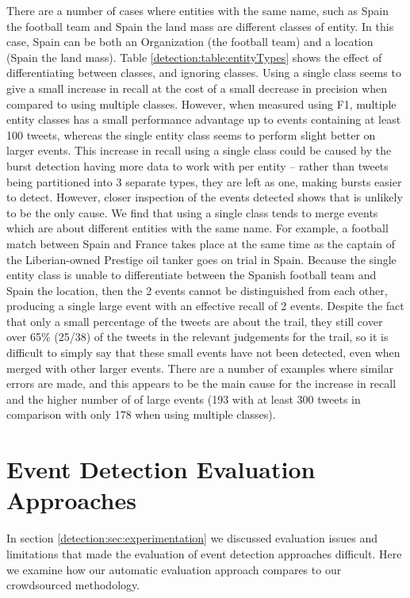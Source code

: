 There are a number of cases where entities with the same name, such as Spain the football team and Spain the land mass are different classes of entity. In this case, Spain can be both an Organization (the football team) and a location (Spain the land mass).
Table \ref{detection:table:entityTypes} shows the effect of differentiating between classes, and ignoring classes. Using a single class seems to give a small increase in recall at the cost of a small decrease in precision when compared to using multiple classes. However, when measured using F1, multiple entity classes has a small performance advantage up to events containing at least 100 tweets, whereas the single entity class seems to perform slight better on larger events. This increase in recall using a single class could be caused by the burst detection having more data to work with per entity -- rather than tweets being partitioned into 3 separate types, they are left as one, making bursts easier to detect. However, closer inspection of the events detected shows that is unlikely to be the only cause. We find that using a single class tends to merge events which are about different entities with the same name. For example, a football match between Spain and France takes place at the same time as the captain of the Liberian-owned Prestige oil tanker goes on trial in Spain. Because the single entity class is unable to differentiate between the Spanish football team and Spain the location, then the 2 events cannot be distinguished from each other, producing a single large event with an effective recall of 2 events. Despite the fact that only a small percentage of the tweets are about the trail, they still cover over 65\% (25/38) of the tweets in the relevant judgements for the trail, so it is difficult to simply say that these small events have not been detected, even when merged with other larger events. There are a number of examples where similar errors are made, and this appears to be the main cause for the increase in recall and the higher number of of large events (193 with at least 300 tweets in comparison with only 178 when using multiple classes).

\section{Event Detection Evaluation Approaches}
\label{detection:sec:measures}
In section \ref{detection:sec:experimentation} we discussed evaluation issues and limitations that made the evaluation of event detection approaches difficult.
Here we examine how our automatic evaluation approach compares to our crowdsourced methodology.

